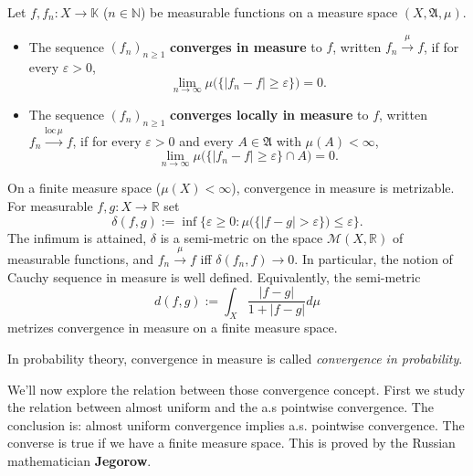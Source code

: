 \begin{definition}
Let $f, f_n : X \to \mathbb{K}$ ($n \in \mathbb{N}$) be measurable functions on a measure space $(X, \mathfrak{A}, \mu)$.
\begin{itemize}
	\item The sequence $(f_n)_{n \geq 1}$ \textbf{converges in measure} to $f$, written $f_n \xrightarrow{\mu} f$, if for every $\varepsilon > 0$,
	\begin{equation*}
		\lim_{n \to \infty} \mu\bigl(\{|f_n - f| \geq \varepsilon\}\bigr) = 0.
	\end{equation*}
	\item The sequence $(f_n)_{n \geq 1}$ \textbf{converges locally in measure} to $f$, written $f_n \xrightarrow{\mathrm{loc}\,\mu} f$, if for every $\varepsilon > 0$ and every $A \in \mathfrak{A}$ with $\mu(A) < \infty$,
	\begin{equation*}
		\lim_{n \to \infty} \mu\bigl(\{|f_n - f| \geq \varepsilon\} \cap A\bigr) = 0.
	\end{equation*}
\end{itemize}
\end{definition}

\begin{remark}
On a finite measure space ($\mu(X) < \infty$), convergence in measure is metrizable. For measurable $f, g : X \to \mathbb{R}$ set
\begin{equation*}
	\delta(f, g) := \inf \bigl\{ \varepsilon \geq 0 : \mu\bigl(\{|f - g| > \varepsilon\}\bigr) \leq \varepsilon \bigr\}.
\end{equation*}
The infimum is attained, $\delta$ is a semi-metric on the space $\mathcal{M}(X, \mathbb{R})$ of measurable functions, and $f_n \xrightarrow{\mu} f$ iff $\delta(f_n, f) \to 0$. In particular, the notion of Cauchy sequence in measure is well defined. Equivalently, the semi-metric
\begin{equation*}
	d(f, g) := \int_X \frac{|f - g|}{1 + |f - g|} d\mu
\end{equation*}
metrizes convergence in measure on a finite measure space.
\end{remark}

\begin{remark}
In probability theory, convergence in measure is called \emph{convergence in probability}.
\end{remark}


We'll now explore the relation between those convergence concept. First we study the relation between almost uniform and the a.s pointwise convergence. The conclusion is: almost uniform convergence implies a.s. pointwise convergence. The converse is true if we have a finite measure space. This is proved by the Russian mathematician \textbf{Jegorow}.


